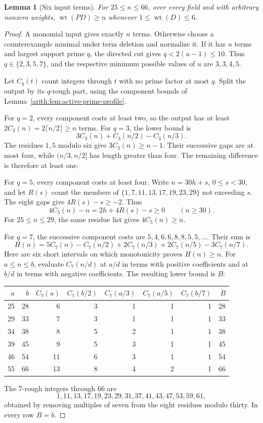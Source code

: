\documentclass[11pt]{article}
\DeclareMathOperator{\wt}{wt}\DeclareMathOperator{\ord}{ord}
\numberwithin{equation}{section}
\newtheorem{lemma}[theorem]{Lemma}
\theoremstyle{definition}\newtheorem{definition}[theorem]{Definition}
\theoremstyle{remark}\newtheorem{remark}[theorem]{Remark}
\begin{document}
\begin{lemma}[Six input terms]\label{lem:fin-six}
For $25\le n\le66$, over every field and with arbitrary nonzero
weights, $\wt(PD)\ge n$ whenever $1\le\wt(D)\le6$.
\end{lemma}
\begin{proof}
A monomial input gives exactly $n$ terms.  Otherwise choose a
counterexample minimal under term deletion and normalize it.  If it has
$u$ terms and largest support prime $q$, the directed cut gives
$q<2(u-1)\le10$.  Thus $q\in\{2,3,5,7\}$, and the respective
minimum possible values of $u$ are $3,3,4,5$.

Let $C_q(t)$ count integers through $t$ with no prime factor at most
$q$. Split the output by its $q$-rough part, using the component
bounds of Lemma~\ref{arith:lem:active-prime-profile}.

For $q=2$, every component costs at least two, so the output has at
least $2C_2(n)=2\lceil n/2\rceil\ge n$ terms.  For $q=3$, the
lower bound is
\[
 3C_3(n)+C_3(n/2)-C_3(n/3).
\]
The residues $1,5$ modulo six give $3C_3(n)\ge n-1$.
Their successive gaps are at most four, while $(n/3,n/2]$ has length
greater than four.  The remaining difference is therefore at least one.

For $q=5$, every component costs at least four.  Write $n=30h+s$,
$0\le s<30$, and let $R(s)$ count the members of
$\{1,7,11,13,17,19,23,29\}$ not exceeding $s$.  The eight gaps give
$4R(s)-s\ge-2$.  Thus
\[
 4C_5(n)-n=2h+4R(s)-s\ge0\qquad(n\ge30).
\]
For $25\le n\le29$, the same residue list gives $4C_5(n)\ge n$.

For $q=7$, the successive component costs are
$5,4,6,6,8,8,5,5,\ldots$.  Their sum is
\[
 H(n)=5C_7(n)-C_7(n/2)+2C_7(n/3)+2C_7(n/5)-3C_7(n/7).
\]
Here are six short intervals on which monotonicity proves $H(n)\ge n$.
For $a\le n\le b$, evaluate $C_7(n/d)$ at $a/d$ in terms with
positive coefficients and at $b/d$ in terms with negative coefficients.
The resulting lower bound is $B$:
\begin{center}
\begin{tabular}{rr|rrrrr|r}
$a$&$b$&$C_7(a)$&$C_7(b/2)$&$C_7(a/3)$&$C_7(a/5)$&$C_7(b/7)$&$B$\\\hline
25&28&6&3&1&1&1&28\\
29&33&7&3&1&1&1&33\\
34&38&8&5&2&1&1&38\\
39&45&9&5&3&1&1&45\\
46&54&11&6&3&1&1&54\\
55&66&13&8&4&2&1&66
\end{tabular}
\end{center}
The $7$-rough integers through $66$ are
\[
 1,11,13,17,19,23,29,31,37,41,43,47,53,59,61,
\]
obtained by removing multiples of seven from the eight residues modulo
thirty. In every row $B=b$.
\end{proof}
\end{document}
